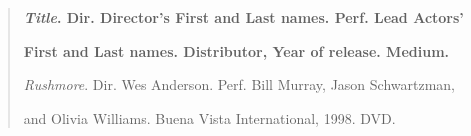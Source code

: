 \begin{quote}

\textbf{\emph{Title}. Dir. Director's First and Last names. Perf. Lead Actors'} 

\hspace{.4in}\textbf{First and Last names. Distributor, Year of release. Medium. }

\medskip

\emph{Rushmore}. Dir. Wes Anderson. Perf. Bill Murray, Jason Schwartzman, 

\hspace{.4in}and Olivia Williams. Buena Vista International, 1998. DVD.

\end{quote}




